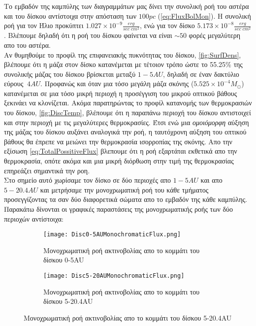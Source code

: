Το εμβαδόν της καμπύλης των διαγραμμάτων μας δίνει την συνολική ροή του αστέρα και του δίσκου αντίστοιχα στην απόσταση των $100pc$ (\ref{eq:FluxBolMon}).
Η συνολική ροή για τον Ήλιο προκύπτει $1.027\times10^{-9} \frac{erg}{sec \; cm^2}$, ενώ για τον δίσκο $5.173\times10^{-8} \frac{erg}{sec \; cm^2}$. Βλέπουμε δηλαδή ότι η ροή του δίσκου φαίνεται να είναι $\sim50$ φορές μεγαλύτερη απο του αστέρα.\\

Αν θυμηθούμε το προφίλ της επιφανειακής πυκνότητας του δίσκου, \ref{fig:SurfDens}, βλέπουμε ότι η μάζα στον δίσκο κατανέμεται με τέτοιον τρόπο ώστε το 55.25\% της συνολικής μάζας του δίσκου βρίσκεται μεταξύ $1-5 AU$, δηλαδή σε έναν δακτύλιο εύρους $~4AU$. Προφανώς και όταν μια τόσο μεγάλη μάζα σκόνης ($5.525\times10^{-4} Μ_{\odot}$) κατανέμεται σε μια τόσο μικρή περιοχή η προσέγγιση του μικρού οπτικού βάθους ξεκινάει να κλονίζεται. Ακόμα παρατηρώντας το προφίλ κατανομής των θερμοκρασιών του δίσκου, \ref{fig:DiscTemp}, βλέπουμε ότι η παραπάνω περιοχή του δίσκου αντιστοιχεί και στην περιοχή με τις μεγαλύτερες θερμοκρασίες. Έτσι ενώ μια {\it ομοιόμορφη} αύξηση της μάζας του δίσκου αυξάνει αναλογικά την ροή, η ταυτόχρονη αύξηση του οπτικού βάθους θα έπρεπε να μειώνει την θερμοκρασία ισορροπίας της σκόνης. Απο την εξίσωση \eqref{eq:TotalPossitiveFlux} βλεπουμε ότι η ροή εξαρτάται εκθετικά απο την θερμοκρασία, οπότε ακόμα και μια μικρή διόρθωση στην τιμή της θερμοκρασίας επηρεάζει σημαντικά την ροη.\\

Στο σημείο αυτό χωρίσαμε τον δίσκο σε δύο περιοχές απο $1-5AU$ και απο $5-20.4AU$ και μετρήσαμε την μονοχρωματική ροή του κάθε τμήματος προσεγγίζοντας τα σαν δύο διαφορετικά σώματα απο το εμβαδόν της κάθε καμπύλης. Παρακάτω δίνονται οι γραφικές παραστάσεις της μονοχρωματικής ροής των δύο περιοχών αντίστοιχα:

\begin{figure}[h]
\centering
 \begin{subfigure}{0.48\textwidth}
  \centering
  \texttt{[image: Disc0-5AUMonochromaticFlux.png]}
  \caption{Μονοχρωματική ροή ακτινοβολίας απο το κομμάτι του δίσκου 0-5{\en AU}}\label{fig:DiscMonochromaticFlux1stPart}
 \end{subfigure}\hfill
 \begin{subfigure}{0.48\textwidth}
  \centering
  \texttt{[image: Disc5-20AUMonochromaticFlux.png]}
  \caption{Μονοχρωματική ροή ακτινοβολίας απο το κομμάτι του δίσκου 5-20.4{\en AU}}\label{fig:DiscMonochromaticFlux2ndPart}
 \end{subfigure}
\end{figure}

